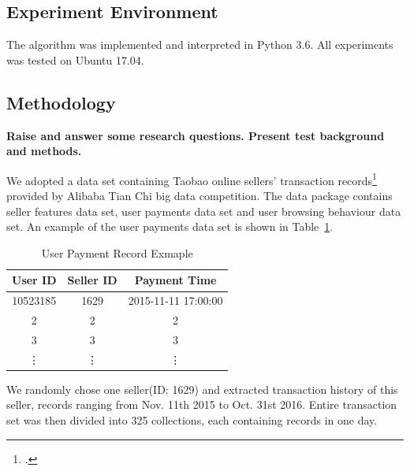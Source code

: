 \documentclass[a4paper]{IEEEtran}
\begin{document}
		\subsection{Experiment Environment}
			The algorithm was implemented and interpreted in Python 3.6. All experiments was tested on Ubuntu 17.04.
		
		\subsection{Methodology}
			\textbf{Raise and answer some research questions. Present test background and methods.}
			
			We adopted a data set containing Taobao online sellers' transaction records\footcite{https://tianchi.aliyun.com/competition/information.htm?raceId=231591} provided by Alibaba Tian Chi big data competition. The data package contains seller features data set, user payments data set and user browsing behaviour data set. An example of the user payments data set is shown in Table~\ref{tab:user-payment-sample}.
			
			\begin{table}[!ht]
				\centering
				\caption{User Payment Record Exmaple}
				\label{tab:user-payment-sample}
				\begin{tabular}{|c|c|c|}
					\hline
					User ID & Seller ID & Payment Time\\
					\hline
					10523185 & 1629 & 2015-11-11 17:00:00\\
					\hline
					2 & 2 & 2\\
					\hline
					3 & 3 & 3\\
					\hline
					\vdots & \vdots & \vdots\\
					\hline
				\end{tabular}
			\end{table}
			
			We randomly chose one seller(ID: 1629) and extracted transaction history of this seller, records ranging from Nov. 11th 2015 to Oct. 31st 2016. Entire transaction set was then divided into 325 collections, each containing records in one day. 
			
\end{document}
